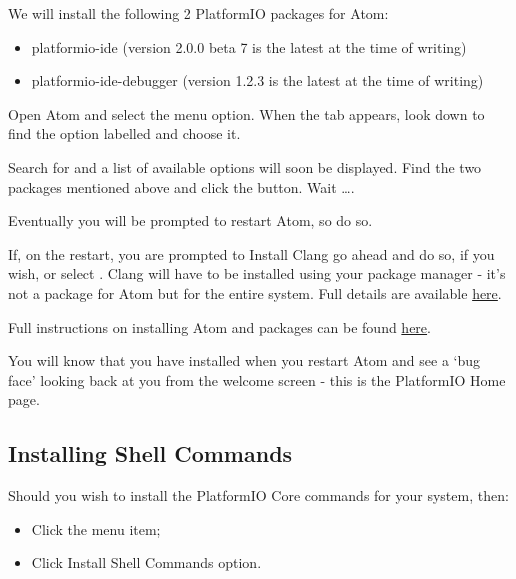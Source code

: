 We will install the following 2 PlatformIO packages for Atom:

\begin{itemize}
\item
  platformio-ide (version 2.0.0 beta 7 is the latest at the time of
  writing)
\item
  platformio-ide-debugger (version 1.2.3 is the latest at the time of
  writing)
\end{itemize}

Open Atom and select the  menu option. When the  tab appears, look down to find the option labelled  and choose it.

Search for  and a list of available options will soon be displayed. Find the two packages mentioned above and click the  button. Wait \ldots{}.

Eventually you will be prompted to restart Atom, so do so.

If, on the restart, you are prompted to Install Clang go ahead and do so, if you wish, or select . Clang will have to be installed using your package manager - it's not a package for Atom but for the entire system. Full details are available  \href{http://docs.platformio.org/en/latest/ide/atom.html\#ii-clang-for-intelligent-code-completion}{here}.

Full instructions on installing Atom and  packages can be found \href{http://docs.platformio.org/en/latest/ide/atom.html\#clang-for-intelligent-code-completion}{here}.

You will know that you have installed  when you restart Atom and see a `bug face' looking back at you from the  welcome screen - this is the PlatformIO Home page.

\subsection{Installing Shell Commands}\label{installing-shell-commands}

Should you wish to install the PlatformIO Core commands for your system, then:

\begin{itemize}
	\item Click the  menu item;
	\item Click Install Shell Commands option.
\end{itemize}

